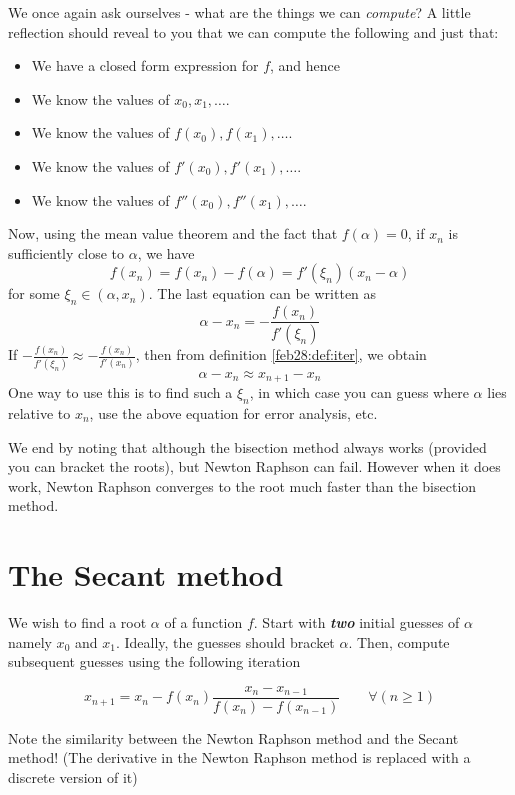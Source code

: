 We once again ask ourselves - what are the things we can \textit{compute}? A little reflection should reveal to you that we can compute the following and just that:
\begin{itemize}
\item
  We have a closed form expression for $f$, and hence

\item
  We know the values of $x_0, x_1, \dots$.

\item
  We know the values of $f(x_0), f(x_1), \dots$.

\item
  We know the values of $f'(x_0), f'(x_1), \dots$.

\item
  We know the values of $f''(x_0), f''(x_1), \dots$.
\end{itemize}
Now, using the mean value theorem and the fact that $f(\alpha) = 0$, if $x_n$ is sufficiently close to $\alpha$, we have
\[
  f(x_n) = f(x_n) - f(\alpha) = f'(\xi_n)(x_n - \alpha)
\]
for some $\xi_n \in (\alpha, x_n)$. The last equation can be written as
\[
  \alpha - x_n = - \frac{f(x_n)}{f'(\xi_n)}
\]
If $- \frac{f(x_n)}{f'(\xi_n)} \approx - \frac{f(x_n)}{f'(x_n)}$, then from definition \ref{feb28:def:iter}, we obtain
\[
  \alpha - x_n \approx x_{n+1} - x_n
\]
One way to use this is to find such a $\xi_n$, in which case you can guess where $\alpha$ lies relative to $x_n$, use the above equation for error analysis, etc.

We end by noting that although the bisection method always works (provided you can bracket the roots), but Newton Raphson can fail. However when it does work, Newton Raphson converges to the root much faster than the bisection method.

\section{The Secant method}

We wish to find a root $\alpha$ of a function $f$. Start with \textbf{\textit{two}} initial guesses of $\alpha$ namely $x_0$ and $x_1$. Ideally, the guesses should bracket $\alpha$. Then, compute subsequent guesses using the following iteration
\begin{defn}
  \[
    x_{n+1} = x_n - f(x_n)\frac{x_n - x_{n-1}}{f(x_n) - f(x_{n-1})} \qquad \forall(n \geq 1)
  \]
\end{defn}

Note the similarity between the Newton Raphson method and the Secant method! (The derivative in the Newton Raphson method is replaced with a discrete version of it)


